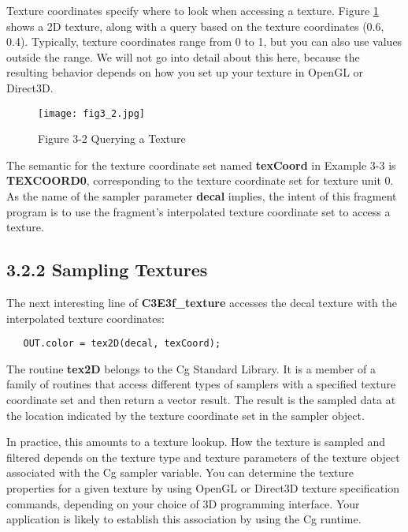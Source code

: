 \documentclass[../main.tex]{subfiles}
\begin{document}
Texture coordinates specify where to look when accessing a texture. Figure \ref{fig:3-2} shows a 2D texture, along with a query based on the texture coordinates (0.6, 0.4). Typically, texture coordinates range from 0 to 1, but you can also use values outside the range. We will not go into detail about this here, because the resulting behavior depends on how you set up your texture in OpenGL or Direct3D.

\begin{figure}
    \centering
    \texttt{[image: fig3\_2.jpg]}
    \caption{Figure 3-2 Querying a Texture}
    \label{fig:3-2}
\end{figure}

The semantic for the texture coordinate set named \textbf{texCoord} in Example 3-3 is \textbf{TEXCOORD0}, corresponding to the texture coordinate set for texture unit 0. As the name of the sampler parameter \textbf{decal} implies, the intent of this fragment program is to use the fragment's interpolated texture coordinate set to access a texture.

\subsection{3.2.2 Sampling Textures}

The next interesting line of \textbf{C3E3f_texture} accesses the decal texture with the interpolated texture coordinates:

\FloatBarrier
\begin{lstlisting}
   OUT.color = tex2D(decal, texCoord);
\end{lstlisting}
\FloatBarrier

The routine \textbf{tex2D} belongs to the Cg Standard Library. It is a member of a family of routines that access different types of samplers with a specified texture coordinate set and then return a vector result. The result is the sampled data at the location indicated by the texture coordinate set in the sampler object.

In practice, this amounts to a texture lookup. How the texture is sampled and filtered depends on the texture type and texture parameters of the texture object associated with the Cg sampler variable. You can determine the texture properties for a given texture by using OpenGL or Direct3D texture specification commands, depending on your choice of 3D programming interface. Your application is likely to establish this association by using the Cg runtime.
\end{document}
